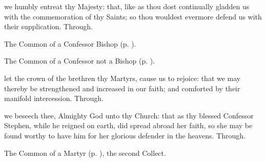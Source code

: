 
\memorialCollect
{} we humbly entreat thy Majesty: that, like as thou dost continually gladden us with the commemoration of thy Saints; so thou wouldest evermore defend us with their supplication. Through.



\begin{rubric}
	The Common of a Confessor Bishop (p. \pageref{ConfessorBishopCollect}).
\end{rubric}



\begin{rubric}
	The Common of a Confessor not a Bishop (p. \pageref{AbbotCollect}).
\end{rubric}



\memorialCollect
{} let the crown of the brethren thy Martyrs, cause us to rejoice: that we may thereby be strengthened and increased in our faith; and comforted by their manifold intercession. Through.


\clearpage
{}

\memorialCollect
{} we beseech thee, Almighty God unto thy Church: that as thy blessed Confessor Stephen, while he reigned on earth, did spread abroad her faith, so she may be found worthy to have him for her glorious defender in the heavens. Through.



\begin{rubric}
	The Common of a Martyr (p. \pageref{CommonMartyr}), the second Collect.
\end{rubric}



